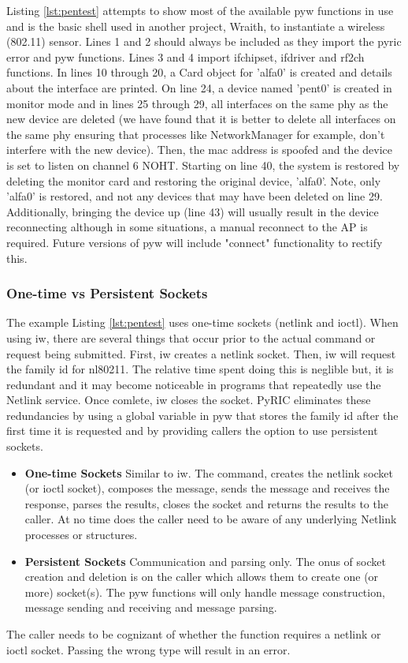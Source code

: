 \documentclass[11pt]{article}
\begin{document}
Listing \ref{lst:pentest} attempts to show most of the available pyw functions 
in use and is the basic shell used in another project, Wraith\cite{wraith}, to 
instantiate a wireless (802.11) sensor. Lines 1 and 2 should always be included 
as they import the pyric error and pyw functions. Lines 3 and 4 import ifchipset, 
ifdriver and rf2ch functions. In lines 10 through 20, a Card object for 'alfa0' 
is created and details about the interface are printed. On line 24, a device named 
'pent0' is created in monitor mode and in lines 25 through 29, all interfaces on 
the same phy as the new device are deleted (we have found that it is better to 
delete all interfaces on the same phy ensuring that processes like NetworkManager 
for example, don't interfere with the new device). Then, the mac address is spoofed 
and the device is set to listen on channel 6 NOHT. Starting on line 40, the system 
is restored by deleting the monitor card and restoring the original device, 'alfa0'. 
Note, only 'alfa0' is restored, and not any devices that may have been deleted on 
line 29. Additionally, bringing the device up (line 43) will usually result in the 
device reconnecting although in some situations, a manual reconnect to the AP is 
required. Future versions of pyw will include "connect" functionality to rectify 
this. 

\subsubsection{One-time vs Persistent Sockets}
The example Listing \ref{lst:pentest} uses one-time sockets (netlink and ioctl).
When using iw, there are several things that occur prior to the actual command
or request being submitted. First, iw creates a netlink socket. Then, iw will 
request the family id for nl80211. The relative time spent doing this is neglible 
but, it is redundant and it may become noticeable in programs that repeatedly 
use the Netlink service. Once comlete, iw closes the socket. PyRIC eliminates 
these redundancies by using a global variable in pyw that stores the family id 
after the first time it is requested and by providing callers the option to use 
persistent sockets. 
\begin{itemize}
\item \textbf{One-time Sockets} Similar to iw. The command, creates the netlink 
socket (or ioctl socket), composes the message, sends the message and receives 
the response, parses the results, closes the socket and returns the results to 
the caller. At no time does the caller need to be aware of any underlying Netlink 
processes or structures.
\item \textbf{Persistent Sockets} Communication and parsing only. The onus of 
socket creation and deletion is on the caller which allows them to create one 
(or more) socket(s). The pyw functions will only handle message construction, 
message sending and receiving and message parsing.
\end{itemize}
The caller needs to be cognizant of whether the function requires a netlink or
ioctl socket. Passing the wrong type will result in an error. \\
\end{document}
